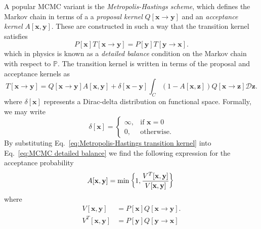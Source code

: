 A popular MCMC variant is the \textit{Metropolis-Hastings scheme}\citep{metropolisEquationStateCalculations1953, hastingsMonteCarloSampling1970}, which defines the Markov chain in terms of a a \textit{proposal kernel} $Q[\mathbf{x} \to \mathbf{y}]$ and an \textit{acceptance kernel} $A[\mathbf{x}, \mathbf{y}]$. These are constructed in such a way that the transition kernel satisfies
\begin{equation} \label{eq:MCMC detailed balance}
P[\mathbf{x}] T[\mathbf{x} \to \mathbf{y}]  = P[\mathbf{y}] T[\mathbf{y} \to \mathbf{x}] .
\end{equation}
which in physics is known as a \textit{detailed balance} condition on the Markov chain with respect to $\mathbb{P}$. The transition kernel is written in terms of the proposal and acceptance kernels as
\begin{equation} \label{eq:Metropolis-Hastings transition kernel}
T[\mathbf{x} \to \mathbf{y}]  = Q[\mathbf{x} \to \mathbf{y}] A[\mathbf{x}, \mathbf{y}] 
+ \delta[\mathbf{x} - \mathbf{y}] \int_C (1 - A[\mathbf{x}, \mathbf{z}]) Q[\mathbf{x} \to \mathbf{z}] \mathcal{D}\mathbf{z}.
\end{equation}
where $\delta[\mathbf{x}]$ represents a Dirac-delta distribution on functional space. Formally, we may write
\begin{equation}
	\delta[\mathbf{x}] = \begin{cases}
		\infty, & \text{if } \mathbf{x} = 0 \\
		0, & \text{otherwise}.
	\end{cases}
\end{equation}
By substituting Eq.~\ref{eq:Metropolis-Hastings transition kernel} into Eq.~\ref{eq:MCMC detailed balance} we find the following expression for the acceptance probability
\begin{equation} \label{eq:MCMC acceptance probability (non rigorous)}
	A[\mathbf{x}, \mathbf{y}] = \text{min}\left\{ 1,
\frac{V^T[\mathbf{x}, \mathbf{y}]}{V[\mathbf{x}, \mathbf{y}]}
\right\} \\
\end{equation}
where
\begin{subequations} \label{eq:forward and backward measures}
\begin{align}
V[\mathbf{x}, \mathbf{y}] & = P[\mathbf{x}] Q[\mathbf{x} \to \mathbf{y}]. \\
V^T[\mathbf{x}, \mathbf{y}] & = P[\mathbf{y}] Q[\mathbf{y} \to \mathbf{x}]
\end{align}
\end{subequations}
